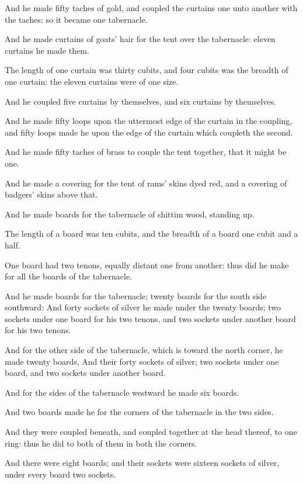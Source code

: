 \Verse And he made fifty taches of gold, and coupled the curtains one unto another with the taches: so it became one tabernacle.

\Verse And he made curtains of goats' hair for the tent over the tabernacle: eleven curtains he made them.

\Verse The length of one curtain was thirty cubits, and four cubits was the breadth of one curtain: the eleven curtains were of one size.

\Verse And he coupled five curtains by themselves, and six curtains by themselves.

\Verse And he made fifty loops upon the uttermost edge of the curtain in the coupling, and fifty loops made he upon the edge of the curtain which coupleth the second.

\Verse And he made fifty taches of brass to couple the tent together, that it might be one.

\Verse And he made a covering for the tent of rams' skins dyed red, and a covering of badgers' skins above that.

\Verse And he made boards for the tabernacle of shittim wood, standing up.

\Verse The length of a board was ten cubits, and the breadth of a board one cubit and a half.

\Verse One board had two tenons, equally distant one from another: thus did he make for all the boards of the tabernacle.

\Verse And he made boards for the tabernacle; twenty boards for the south side southward: \Verse And forty sockets of silver he made under the twenty boards; two sockets under one board for his two tenons, and two sockets under another board for his two tenons.

\Verse And for the other side of the tabernacle, which is toward the north corner, he made twenty boards, \Verse And their forty sockets of silver; two sockets under one board, and two sockets under another board.

\Verse And for the sides of the tabernacle westward he made six boards.

\Verse And two boards made he for the corners of the tabernacle in the two sides.

\Verse And they were coupled beneath, and coupled together at the head thereof, to one ring: thus he did to both of them in both the corners.

\Verse And there were eight boards; and their sockets were sixteen sockets of silver, under every board two sockets.


